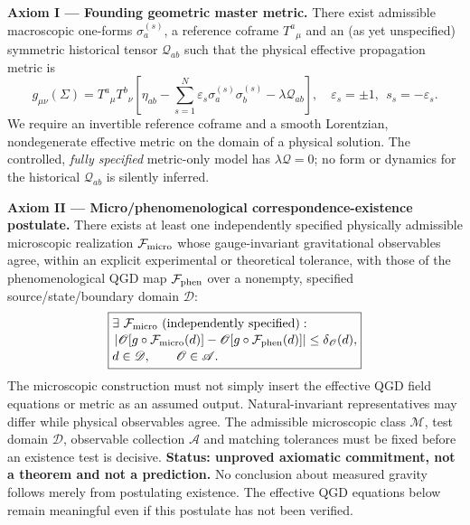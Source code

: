 \documentclass[11pt,a4paper]{article}
\begin{document}
\medskip\noindent\textbf{Axiom I --- Founding geometric master metric.}
There exist admissible macroscopic one-forms $\sigma_a^{(s)}$, a reference coframe $T^a{}_{\mu}$ and an (as yet unspecified) symmetric historical tensor $\mathcal Q_{ab}$ such that the physical effective propagation metric is
\begin{equation}\label{eq:qgd-axiomI-2026}
\boxed{g_{\mu\nu}(\Sigma)=T^a{}_{\mu}T^b{}_{\nu}\left[\eta_{ab}-\sum_{s=1}^{N}\varepsilon_s\sigma_a^{(s)}\sigma_b^{(s)}-\lambda\mathcal Q_{ab}\right],\quad \varepsilon_s=\pm1,\ \ s_s=-\varepsilon_s.}
\end{equation}
We require an invertible reference coframe and a smooth Lorentzian, nondegenerate effective metric on the domain of a physical solution. The controlled, \emph{fully specified} metric-only model has $\lambda\mathcal Q=0$; no form or dynamics for the historical $\mathcal Q_{ab}$ is silently inferred.

\medskip\noindent\textbf{Axiom II --- Micro/phenomenological correspondence-existence postulate.}
There exists at least one independently specified physically admissible microscopic realization $\mathcal F_{\rm micro}$ whose gauge-invariant gravitational observables agree, within an explicit experimental or theoretical tolerance, with those of the phenomenological QGD map $\mathcal F_{\rm phen}$ over a nonempty, specified source/state/boundary domain $\mathscr D$:
\begin{equation}\label{eq:qgd-axiomII-2026}
\boxed{\begin{aligned}
&\exists\ \mathcal F_{\rm micro}\text{ (independently specified)}:\\[-2pt]
&\left|\mathscr O\!\left[g\circ\mathcal F_{\rm micro}(d)\right]-\mathscr O\!\left[g\circ\mathcal F_{\rm phen}(d)\right]\right|\le\delta_{\mathscr O}(d),\\[-2pt]
&d\in\mathscr D,\qquad\mathscr O\in\mathscr A.
\end{aligned}}
\end{equation}
The microscopic construction must not simply insert the effective QGD field equations or metric as an assumed output. Natural-invariant representatives may differ while physical observables agree. The admissible microscopic class $\mathscr M$, test domain $\mathscr D$, observable collection $\mathscr A$ and matching tolerances must be fixed before an existence test is decisive. \textbf{Status: unproved axiomatic commitment, not a theorem and not a prediction.} No conclusion about measured gravity follows merely from postulating existence. The effective QGD equations below remain meaningful even if this postulate has not been verified.
\end{document}
